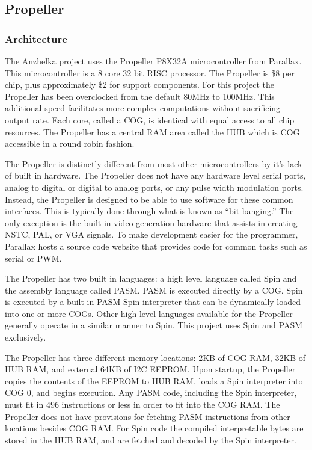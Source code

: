 \documentclass{article}
\numberwithin{equation}{section} %
\begin{document}
\subsection{Propeller}

\subsubsection{Architecture}

The Anzhelka project uses the Propeller P8X32A microcontroller from Parallax. This microcontroller is a 8 core 32 bit RISC processor. The Propeller is \$8 per chip, plus approximately \$2 for support components. For this project the Propeller has been overclocked from the default 80MHz to 100MHz. This additional speed facilitates more complex computations without sacrificing output rate. Each core, called a COG, is identical with equal access to all chip resources. The Propeller has a central RAM area called the HUB which is COG accessible in a round robin fashion.

The Propeller is distinctly different from most other microcontrollers by it's lack of built in hardware. The Propeller does not have any hardware level serial ports, analog to digital or digital to analog ports, or any pulse width modulation ports. Instead, the Propeller is designed to be able to use software for these common interfaces. This is typically done through what is known as “bit banging.” The only exception is the built in video generation hardware that assists in creating NSTC, PAL, or VGA signals. To make development easier for the programmer, Parallax hosts a source code website that provides code for common tasks such as serial or PWM.

The Propeller has two built in languages: a high level language called Spin and the assembly language called PASM. PASM is executed directly by a COG. Spin is executed by a built in PASM Spin interpreter that can be dynamically loaded into one or more COGs. Other high level languages available for the Propeller generally operate in a similar manner to Spin. This project uses Spin and PASM exclusively.

The Propeller has three different memory locations: 2KB of COG RAM, 32KB of HUB RAM, and external 64KB of I2C EEPROM. Upon startup, the Propeller copies the contents of the EEPROM to HUB RAM, loads a Spin interpreter into COG 0, and begins execution.  Any PASM code, including the Spin interpreter, must fit in 496 instructions or less in order to fit into the COG RAM. The Propeller does not have provisions for fetching PASM instructions from other locations besides COG RAM. For Spin code the compiled interpretable bytes are stored in the HUB RAM, and are fetched and decoded by the Spin interpreter.
\end{document}
